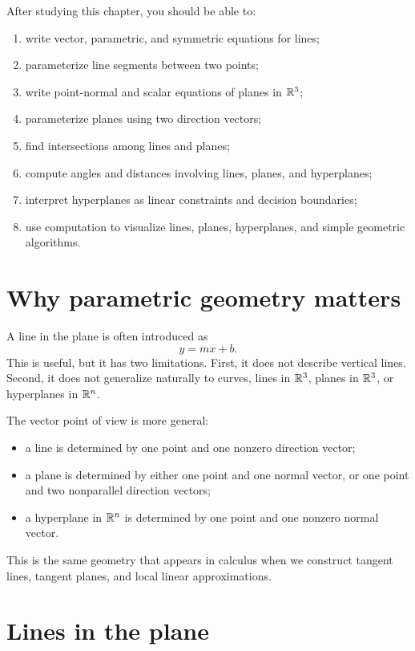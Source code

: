 After studying this chapter, you should be able to:
\begin{enumerate}
\item write vector, parametric, and symmetric equations for lines;
\item parameterize line segments between two points;
\item write point-normal and scalar equations of planes in $\mathbb{R}^3$;
\item parameterize planes using two direction vectors;
\item find intersections among lines and planes;
\item compute angles and distances involving lines, planes, and hyperplanes;
\item interpret hyperplanes as linear constraints and decision boundaries;
\item use computation to visualize lines, planes, hyperplanes, and simple geometric algorithms.
\end{enumerate}

\section{Why parametric geometry matters}

A line in the plane is often introduced as
\[
  y=mx+b.
\]
This is useful, but it has two limitations. First, it does not describe vertical lines. Second, it does not generalize naturally to curves, lines in $\mathbb{R}^3$, planes in $\mathbb{R}^3$, or hyperplanes in $\mathbb{R}^n$.

The vector point of view is more general:
\begin{itemize}
\item a line is determined by one point and one nonzero direction vector;
\item a plane is determined by either one point and one normal vector, or one point and two nonparallel direction vectors;
\item a hyperplane in $\mathbb{R}^n$ is determined by one point and one nonzero normal vector.
\end{itemize}

This is the same geometry that appears in calculus when we construct tangent lines, tangent planes, and local linear approximations.

\section{Lines in the plane}

